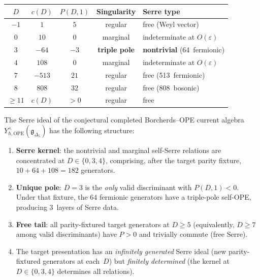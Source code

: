 \begin{center}
\renewcommand{\arraystretch}{1.15}
\begin{tabular}{ccccl}
\toprule
$D$ & $c(D)$ & $P(D, 1)$ & Singularity & Serre type \\
\midrule
$-1$ & $1$ & $5$ & regular & free (Weyl vector) \\
$0$ & $10$ & $0$ & marginal & indeterminate at $O(\varepsilon)$ \\
$3$ & $-64$ & $-3$ & \textbf{triple pole} & \textbf{nontrivial} (64~fermionic) \\
$4$ & $108$ & $0$ & marginal & indeterminate at $O(\varepsilon)$ \\
$7$ & $-513$ & $21$ & regular & free (513~fermionic) \\
$8$ & $808$ & $32$ & regular & free (808~bosonic) \\
$\geq 11$ & $c(D)$ & $> 0$ & regular & free \\
\bottomrule
\end{tabular}
\end{center}

\begin{conjecture}
\label{conj:deformed-serre-structure}
The Serre ideal of the conjectural completed Borcherds--OPE current algebra
$Y^\wedge_{\hbar,\mathrm{OPE}}(\mathfrak g_{\Delta_5})$
has the following structure:
\begin{enumerate}
\item \textbf{Serre kernel}: the nontrivial and marginal self-Serre relations
are concentrated at $D \in \{0, 3, 4\}$, comprising, after the target
parity fixture, $10 + 64 + 108 = 182$ generators.
	\item \textbf{Unique pole}: $D = 3$ is the \emph{only} valid discriminant with
	$P(D, 1) < 0$. Under that fixture, the $64$ fermionic generators have a triple-pole self-OPE,
producing $3$~layers of Serre data.
	\item \textbf{Free tail}: all parity-fixtured target generators at $D \geq 5$ (equivalently, $D \geq 7$
among valid discriminants) have $P > 0$ and trivially commute (free Serre).
\item The target presentation has an \emph{infinitely generated} Serre ideal (new parity-fixtured generators at each~$D$)
but \emph{finitely determined} (the kernel at $D \in \{0, 3, 4\}$ determines
all relations).
\end{enumerate}
\end{conjecture}

